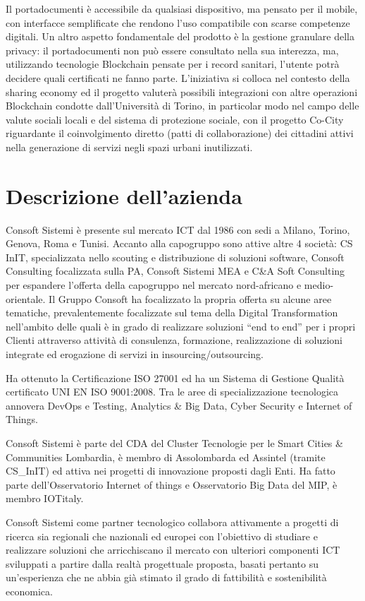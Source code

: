 Il portadocumenti è accessibile da qualsiasi dispositivo, ma pensato per il mobile, con interfacce semplificate che rendono l’uso compatibile con scarse competenze digitali.
Un altro aspetto fondamentale del prodotto è la gestione granulare della privacy: il portadocumenti non può essere consultato nella sua interezza, ma, utilizzando tecnologie Blockchain pensate per i record sanitari, l’utente potrà decidere quali certificati ne fanno parte. L’iniziativa si colloca nel contesto della sharing economy ed il progetto valuterà possibili integrazioni con altre operazioni Blockchain condotte dall’Università di Torino, in particolar modo nel campo delle valute sociali locali e del sistema di protezione sociale, con il progetto Co-City riguardante il coinvolgimento diretto (patti di collaborazione) dei cittadini attivi nella generazione di servizi negli spazi urbani inutilizzati.


\section{Descrizione dell'azienda}
Consoft Sistemi è presente sul mercato ICT dal 1986 con sedi a Milano, Torino, Genova, Roma e Tunisi.
Accanto alla capogruppo sono attive altre 4 società: CS InIT, specializzata nello scouting e distribuzione di soluzioni software, Consoft Consulting 
focalizzata sulla PA, Consoft Sistemi MEA e C\&A Soft Consulting per espandere l’offerta della capogruppo nel mercato nord-africano e medio-orientale. 
Il Gruppo Consoft ha focalizzato la propria offerta su alcune aree tematiche, prevalentemente focalizzate sul tema della Digital Transformation nell’ambito
delle quali è in grado di realizzare soluzioni “end to end” per i propri Clienti attraverso attività di consulenza, formazione, realizzazione di soluzioni
integrate ed erogazione di servizi in insourcing/outsourcing.

Ha ottenuto la Certificazione ISO 27001 ed ha un Sistema di Gestione Qualità certificato UNI EN ISO 9001:2008. Tra le aree di specializzazione tecnologica
annovera DevOps e Testing, Analytics \& Big Data, Cyber Security e Internet of Things.

Consoft Sistemi è parte del CDA del Cluster Tecnologie
per le Smart Cities \& Communities Lombardia, è membro di Assolombarda ed Assintel
(tramite CS\_InIT) ed attiva nei progetti di innovazione proposti dagli Enti.
Ha fatto parte dell’Osservatorio Internet of things e Osservatorio Big Data del MIP, è membro IOTitaly.

Consoft Sistemi come partner tecnologico collabora attivamente a progetti di ricerca sia regionali che nazionali ed europei con l’obiettivo di studiare
e realizzare soluzioni che arricchiscano il mercato con ulteriori componenti ICT sviluppati a partire dalla realtà progettuale proposta,
basati pertanto su un'esperienza che ne abbia già stimato il grado di fattibilità e sostenibilità economica.

